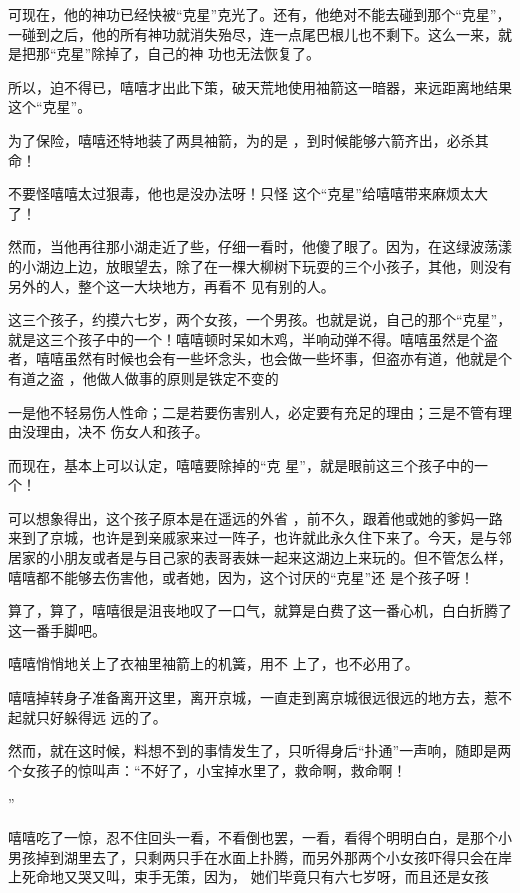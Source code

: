 \documentclass{article}
\begin{document}
可现在，他的神功已经快被“克星”克光了。还有，他绝对不能去碰到那个“克星”，一碰到之后，他的所有神功就消失殆尽，连一点尾巴根儿也不剩下。这么一来，就是把那“克星”除掉了，自己的神
功也无法恢复了。 

所以，迫不得已，嘻嘻才出此下策，破天荒地使用袖箭这一暗器，来远距离地结果这个“克星”。

为了保险，嘻嘻还特地装了两具袖箭，为的是
，到时候能够六箭齐出，必杀其命！ 

不要怪嘻嘻太过狠毒，他也是没办法呀！只怪
这个“克星”给嘻嘻带来麻烦太大了！ 

\newpage

然而，当他再往那小湖走近了些，仔细一看时，他傻了眼了。因为，在这绿波荡漾的小湖边上边，放眼望去，除了在一棵大柳树下玩耍的三个小孩子，其他，则没有另外的人，整个这一大块地方，再看不
见有别的人。 

这三个孩子，约摸六七岁，两个女孩，一个男孩。也就是说，自己的那个“克星”，就是这三个孩子中的一个！嘻嘻顿时呆如木鸡，半响动弹不得。嘻嘻虽然是个盗者，嘻嘻虽然有时候也会有一些坏念头，也会做一些坏事，但盗亦有道，他就是个有道之盗
，他做人做事的原则是铁定不变的 

一是他不轻易伤人性命；二是若要伤害别人，必定要有充足的理由；三是不管有理由没理由，决不
伤女人和孩子。 

而现在，基本上可以认定，嘻嘻要除掉的“克
星”，就是眼前这三个孩子中的一个！ 

可以想象得出，这个孩子原本是在遥远的外省
\newpage
，前不久，跟着他或她的爹妈一路来到了京城，也许是到亲戚家来过一阵子，也许就此永久住下来了。今天，是与邻居家的小朋友或者是与目己家的表哥表妹一起来这湖边上来玩的。但不管怎么样，嘻嘻都不能够去伤害他，或者她，因为，这个讨厌的“克星”还
是个孩子呀！ 

算了，算了，嘻嘻很是沮丧地叹了一口气，就算是白费了这一番心机，白白折腾了这一番手脚吧。

嘻嘻悄悄地关上了衣袖里袖箭上的机簧，用不
上了，也不必用了。 

嘻嘻掉转身子准备离开这里，离开京城，一直走到离京城很远很远的地方去，惹不起就只好躲得远
远的了。 

然而，就在这时候，料想不到的事情发生了，只听得身后“扑通”一声响，随即是两个女孩子的惊叫声：“不好了，小宝掉水里了，救命啊，救命啊！

\newpage
” 

嘻嘻吃了一惊，忍不住回头一看，不看倒也罢，一看，看得个明明白白，是那个小男孩掉到湖里去了，只剩两只手在水面上扑腾，而另外那两个小女孩吓得只会在岸上死命地又哭又叫，束手无策，因为，
她们毕竟只有六七岁呀，而且还是女孩 
\end{document}
